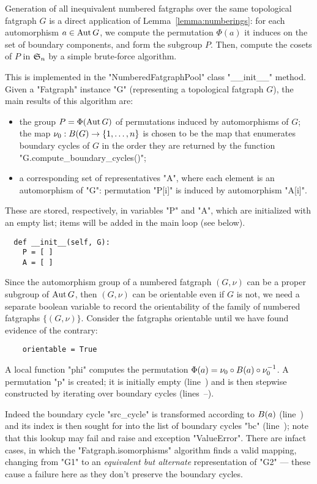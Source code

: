Generation of all inequivalent numbered fatgraphs over the same
topological fatgraph $G$ is a direct application of
Lemma~\ref{lemma:numberings}: for each automorphism $a \in \operatorname{Aut} G$, we
compute the permutation $\Phi(a)$ it induces on the set of boundary
components, and form the subgroup $P$.  Then, compute the cosets of
$P$ in $\mathfrak{S}_{n}$ by a simple brute-force algorithm.

This is implemented in the "NumberedFatgraphPool" class "__init__"
method.  Given a "Fatgraph" instance "G" (representing a topological
fatgraph $G$), the main results of this algorithm are:
\begin{itemize}
\item the group $P = \Phi(\operatorname{Aut} G)$ of permutations induced by
  automorphisms of $G$; the map $\nu_0:
  B(G) \to \{1, \ldots, n\}$ is chosen to be the map that
  enumerates boundary cycles of $G$ in the order they are returned by
  the function "G.compute_boundary_cycles()";
\item a corresponding set of representatives "A", where each element
  is an automorphism of "G": permutation "P[i]" is induced by
  automorphism "A[i]".
\end{itemize}
These are stored, respectively, in variables "P" and "A", which are
initialized with an empty list; items will be added in the main loop
(see below).
\begin{lstlisting}
  def __init__(self, G):
    P = [ ] 
    A = [ ] 

\end{lstlisting}
Since the automorphism group of a numbered fatgraph $(G, \nu)$ can be a proper
subgroup of $\operatorname{Aut} G$, then $(G,\nu)$ can be orientable even if $G$ is
not, we need a separate boolean variable to record the orientability
of the family of numbered fatgraphs $\{ (G, \nu) \}$.
Consider the fatgraphs orientable until we have found evidence of the
contrary:
\begin{lstlisting}
    orientable = True

\end{lstlisting}

A local function "phi" computes the permutation $\Phi(a) = \nu_0 \circ
B(a) \circ \nu_0^{-1}$.  A permutation "p" is created; it is
initially empty (line~) and is then stepwise constructed by
iterating over boundary cycles (lines~--).  

Indeed the boundary cycle "src_cycle" is transformed according to
$B(a)$ (line~) and its index is then sought for into
the list of boundary cycles "bc" (line~); note that this
lookup may fail and raise and exception "ValueError".  There are
infact cases, in which the "Fatgraph.isomorphisms" algorithm finds a
valid mapping, changing from "G1" to an \emph{equivalent but
  alternate} representation of "G2" --- these cause a failure here as
they don't preserve the boundary cycles.


